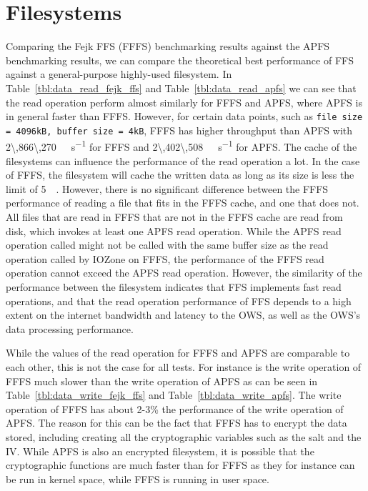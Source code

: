 \section{Filesystems}
Comparing the Fejk FFS (FFFS) benchmarking results against the APFS benchmarking results, we can compare the theoretical best performance of FFS against a general-purpose highly-used filesystem. In Table~\ref{tbl:data_read_fejk_ffs} and Table~\ref{tbl:data_read_apfs} we can see that the read operation perform almost similarly for FFFS and APFS, where APFS is in general faster than FFFS. However, for certain data points, such as \texttt{file size = 4096kB, buffer size = 4kB}, FFFS has higher throughput than APFS with \SI[per-mode = symbol]{2\,866\,270}{\kilo\byte\per\second} for FFFS and \SI[per-mode = symbol]{2\,402\,508}{\kilo\byte\per\second} for APFS. The cache of the filesystems can influence the performance of the read operation a lot. In the case of FFFS, the filesystem will cache the written data as long as its size is less the limit of \SI{5}{\mega\byte}. However, there is no significant difference between the FFFS performance of reading a file that fits in the FFFS cache, and one that does not. All files that are read in FFFS that are not in the FFFS cache are read from disk, which invokes at least one APFS read operation. While the APFS read operation called might not be called with the same buffer size as the read operation called by IOZone on FFFS, the performance of the FFFS read operation cannot exceed the APFS read operation. However, the similarity of the performance between the filesystem indicates that FFS implements fast read operations, and that the read operation performance of FFS depends to a high extent on the internet bandwidth and latency to the OWS, as well as the OWS's data processing performance.

While the values of the read operation for FFFS and APFS are comparable to each other, this is not the case for all tests. For instance is the write operation of FFFS much slower than the write operation of APFS as can be seen in Table~\ref{tbl:data_write_fejk_ffs} and Table~\ref{tbl:data_write_apfs}. The write operation of FFFS has about 2-3\% the performance of the write operation of APFS. The reason for this can be the fact that FFFS has to encrypt the data stored, including creating all the cryptographic variables such as the salt and the IV. While APFS is also an encrypted filesystem, it is possible that the cryptographic functions are much faster than for FFFS as they for instance can be run in kernel space, while FFFS is running in user space.